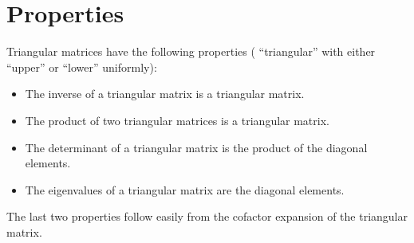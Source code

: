 \documentclass[12pt]{article}
\begin{document}
\section{Properties}

Triangular matrices have the following properties ( ``triangular'' with either ``upper'' or ``lower'' uniformly):

\begin{itemize}
\item The inverse of a triangular matrix is a triangular matrix.
\item The product of two triangular matrices is a triangular matrix.
\item The determinant of a triangular matrix is the product of the diagonal elements.
\item The eigenvalues of a triangular matrix are the diagonal elements.
\end{itemize}

The last two properties follow easily from the cofactor expansion of the triangular matrix.
\end{document}

